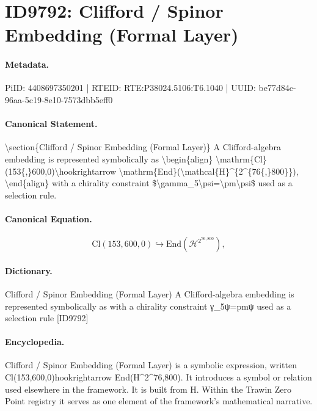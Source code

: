 \section*{ID9792: Clifford / Spinor Embedding (Formal Layer)}
\paragraph{Metadata.}
PiID: 4408697350201 | RTEID: RTE:P38024.5106:T6.1040 | UUID: be77d84c-96aa-5c19-8e10-7573dbb5eff0

\paragraph{Canonical Statement.}
\textbackslash{}section\{Clifford / Spinor Embedding (Formal Layer)\} A Clifford-algebra embedding is represented symbolically as \textbackslash{}begin\{align\} \textbackslash{}mathrm\{Cl\}(153\{,\}600,0)\textbackslash{}hookrightarrow \textbackslash{}mathrm\{End\}(\textbackslash{}mathcal\{H\}\textasciicircum{}\{2\textasciicircum{}\{76\{,\}800\}\}), \textbackslash{}end\{align\} with a chirality constraint \$\textbackslash{}gamma\_5\textbackslash{}psi=\textbackslash{}pm\textbackslash{}psi\$ used as a selection rule.

\paragraph{Canonical Equation.}
\[
\mathrm{Cl}(153{,}600,0)\hookrightarrow \mathrm{End}(\mathcal{H}^{2^{76{,}800}}),
\]

\paragraph{Dictionary.}
Clifford / Spinor Embedding (Formal Layer) A Clifford-algebra embedding is represented symbolically as with a chirality constraint γ\_5ψ=pmψ used as a selection rule [ID9792]

\paragraph{Encyclopedia.}
Clifford / Spinor Embedding (Formal Layer) is a symbolic expression, written Cl(153,600,0)hookrightarrow End(H\textasciicircum{}2\textasciicircum{}76,800). It introduces a symbol or relation used elsewhere in the framework. It is built from H. Within the Trawin Zero Point registry it serves as one element of the framework's mathematical narrative.
